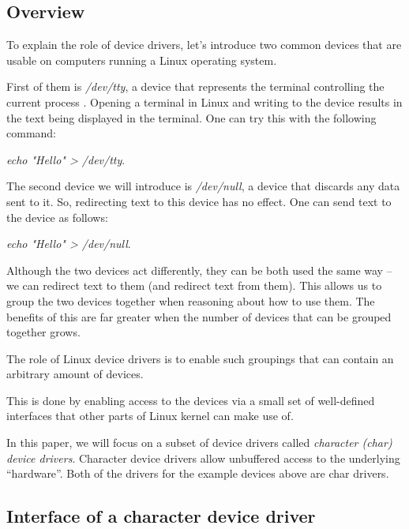 \documentclass[..thesis.tex]{subfiles}
\begin{document}
\subsection{Overview}



To explain the role of device drivers, let's introduce two common devices that are usable on computers running a Linux operating system.

First of them is \textit{/dev/tty}, a device that represents the terminal controlling the current process \cite{torvalds_linux}. Opening a terminal in Linux and writing to the device results in the text being displayed in the terminal. One can try this with the following command: 

\textit{echo "Hello" > /dev/tty}.
 
The second device we will introduce is \textit{/dev/null}, a device that discards any data sent to it. So, redirecting text to this device has no effect.
One can send text to the device as follows:

\textit{echo "Hello" > /dev/null}.

Although the two devices act differently, they can be both used the same way -- we can redirect text to them (and redirect text from them). This allows us to group the two devices together when reasoning about how to use them. The benefits of this are far greater when the number of devices that can be grouped together grows.

The role of Linux device drivers is to enable such groupings that can contain an arbitrary amount of devices.

This is done by enabling access to the devices via a small set of well-defined interfaces that other parts of Linux kernel can make use of. 

In this paper, we will focus on a subset of device drivers called \textit{character (char) device drivers}. Character device drivers allow unbuffered access to the underlying ``hardware''. Both of the drivers for the example devices above are char drivers.

\subsection{Interface of a character device driver}

\end{document}
